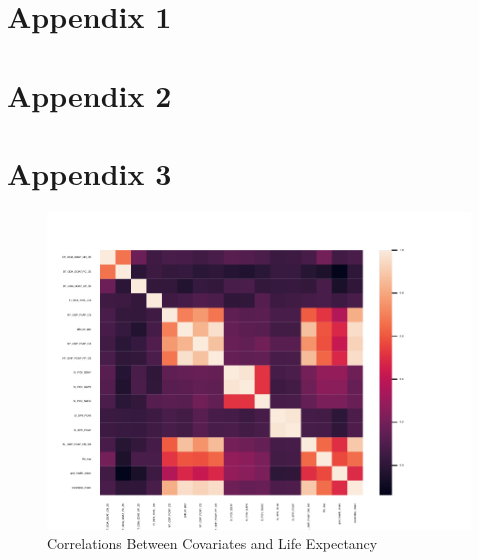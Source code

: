\documentclass[12pt]{article}
\begin{document}
    \clearpage \newpage

    \appendix

    \section*{Appendix 1}

        
        
        
    \section*{Appendix 2}


        
        
        


    \section*{Appendix 3}

        \begin{figure}[h!]
            \centering
            \caption{Correlations Between Covariates and Life Expectancy}
            \label{LE_Health_Econ_Correlations}	
            \includegraphics[width=\linewidth,keepaspectratio=true]{../Output/Figures/LE_Health_Econ_Correlations_combined_short.pdf}
        \end{figure}
\end{document}
